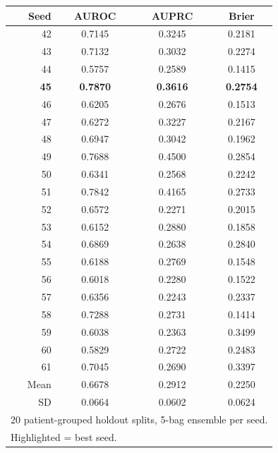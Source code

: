 \documentclass[border=8pt]{standalone}
\begin{document}
\begin{tabular}{r ccc}
\toprule
\textbf{Seed} & \textbf{AUROC} & \textbf{AUPRC} & \textbf{Brier} \\
\midrule
42 & 0.7145 & 0.3245 & 0.2181 \\
43 & 0.7132 & 0.3032 & 0.2274 \\
44 & 0.5757 & 0.2589 & 0.1415 \\
\rowcolor{bestrow} \textbf{45} & \textbf{0.7870} & \textbf{0.3616} & \textbf{0.2754} \\
46 & 0.6205 & 0.2676 & 0.1513 \\
47 & 0.6272 & 0.3227 & 0.2167 \\
48 & 0.6947 & 0.3042 & 0.1962 \\
49 & 0.7688 & 0.4500 & 0.2854 \\
50 & 0.6341 & 0.2568 & 0.2242 \\
51 & 0.7842 & 0.4165 & 0.2733 \\
52 & 0.6572 & 0.2271 & 0.2015 \\
53 & 0.6152 & 0.2880 & 0.1858 \\
54 & 0.6869 & 0.2638 & 0.2840 \\
55 & 0.6188 & 0.2769 & 0.1548 \\
56 & 0.6018 & 0.2280 & 0.1522 \\
57 & 0.6356 & 0.2243 & 0.2337 \\
58 & 0.7288 & 0.2731 & 0.1414 \\
59 & 0.6038 & 0.2363 & 0.3499 \\
60 & 0.5829 & 0.2722 & 0.2483 \\
61 & 0.7045 & 0.2690 & 0.3397 \\
\midrule
Mean & 0.6678 & 0.2912 & 0.2250 \\
SD   & 0.0664 & 0.0602 & 0.0624 \\
\bottomrule
\multicolumn{4}{l}{\footnotesize 20 patient-grouped holdout splits, 5-bag ensemble per seed.} \\
\multicolumn{4}{l}{\footnotesize \colorbox{bestrow}{Highlighted} = best seed.} \\
\end{tabular}
\end{document}
